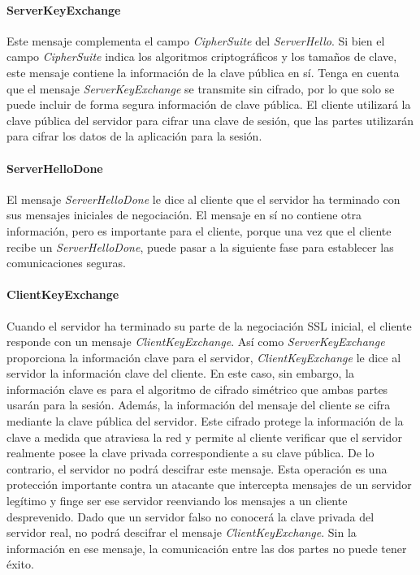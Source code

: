 \paragraph*{ServerKeyExchange}

Este mensaje complementa el campo \emph{CipherSuite} del \emph{ServerHello}. 
Si bien el campo \emph{CipherSuite} indica los algoritmos criptográficos y 
los tamaños de clave, este mensaje contiene la información de la clave 
pública en sí. Tenga en cuenta que el mensaje \emph{ServerKeyExchange} se 
transmite sin cifrado, por lo que solo se puede incluir de forma 
segura información de clave pública. El cliente utilizará la clave 
pública del servidor para cifrar una clave de sesión, que las partes 
utilizarán para cifrar los datos de la aplicación para la sesión.

\paragraph*{ServerHelloDone}
El mensaje \emph{ServerHelloDone} le dice al cliente que el servidor ha 
terminado con sus mensajes iniciales de negociación. El mensaje en 
sí no contiene otra información, pero es importante para el cliente, 
porque una vez que el cliente recibe un \emph{ServerHelloDone}, puede pasar a 
la siguiente fase para establecer las comunicaciones seguras.

\paragraph*{ClientKeyExchange}
Cuando el servidor ha terminado su parte de la negociación SSL inicial, 
el cliente responde con un mensaje \emph{ClientKeyExchange}. Así como 
\emph{ServerKeyExchange} proporciona la información clave para el servidor, 
\emph{ClientKeyExchange} le dice al servidor la información clave del cliente. 
En este caso, sin embargo, la información clave es para el algoritmo de 
cifrado simétrico que ambas partes usarán para la sesión. Además, la 
información del mensaje del cliente se cifra mediante la clave pública 
del servidor. Este cifrado protege la información de la clave a medida 
que atraviesa la red y permite al cliente verificar que el servidor 
realmente posee la clave privada correspondiente a su clave pública. 
De lo contrario, el servidor no podrá descifrar este mensaje. Esta 
operación es una protección importante contra un atacante que intercepta 
mensajes de un servidor legítimo y finge ser ese servidor reenviando los 
mensajes a un cliente desprevenido. Dado que un servidor falso no conocerá 
la clave privada del servidor real, no podrá descifrar el mensaje 
\emph{ClientKeyExchange}. Sin la información en ese mensaje, la comunicación 
entre las dos partes no puede tener éxito.
